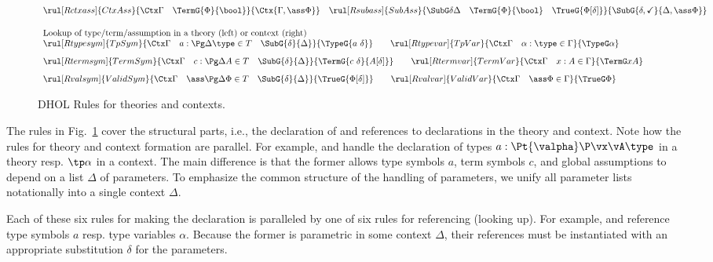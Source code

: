 \begin{figure}[htbp]
\[\begin{array}{l}
    \rul[Rctxass] {CtxAss} {\Ctx \Gamma \quad \TermG{\Phi}{\bool}}{\Ctx{\Gamma,\ass \Phi}} \quad
    \rul[Rsubass] {SubAss} {\SubG \delta\Delta \quad \TermG{\Phi}{\bool}\quad \TrueG {\Phi[\delta]}}   {\SubG{\delta,\checkmark}{\Delta,\ass \Phi}}\\[.5cm]
    \text{Lookup of type/term/assumption in a theory (left) or context (right)}\\%
    \rul[Rtypesym]{TpSym}{\Ctx \Gamma \quad a:\Pg\Delta \type \in T\quad \SubG{\delta}{\Delta}}{\TypeG{a\ \delta }} \qquad
    \rul[Rtypevar]{TpVar}{\Ctx \Gamma \quad \alpha :\type\in\Gamma}{\TypeG \alpha}\\[.3cm]
    \rul[Rtermsym]{TermSym}{\Ctx \Gamma \quad c:\Pg\Delta A  \in T\quad \SubG{\delta}{\Delta}}{\TermG{c\ \delta}{A[\delta]}} \qquad
    \rul[Rtermvar]{TermVar}{\Ctx \Gamma \quad x:A\in\Gamma}{\TermG x A}\\[.3cm]
    \rul[Rvalsym]{ValidSym}{\Ctx \Gamma \quad \ass\Pg\Delta \Phi \in T\quad \SubG{\delta}{\Delta}}{\TrueG{\Phi[\delta]}} \qquad
    \rul[Rvalvar]{ValidVar}{\Ctx \Gamma \quad \ass \Phi\in\Gamma}{\TrueG \Phi}\\
  \end{array}\]
\caption{DHOL Rules for theories and contexts.}\label{fig:declrules}
\end{figure}

The rules in Fig.~\ref{fig:declrules} cover the structural parts, i.e., the declaration of and references to declarations in the theory and context.
Note how the rules for theory and context formation are parallel.
For example, \Rthytype and \Rctxtype handle the declaration of types $a:\Pt{\valpha}\P\vx\vA\type$ in a theory resp. $\tp\alpha$ in a context.
The main difference is that the former allows type symbols $a$, term symbols $c$, and global assumptions to depend on a list $\Delta$ of parameters.
To emphasize the common structure of the handling of parameters, we unify all parameter lists notationally into a single context $\Delta$.

Each of these six rules for making the declaration is paralleled by one of six rules for referencing (looking up).
For example, \Rtypesym and \Rtypevar reference type symbols $a$ resp. type variables $\alpha$.
Because the former is parametric in some context $\Delta$, their references must be instantiated with an appropriate substitution $\delta$ for the parameters.


